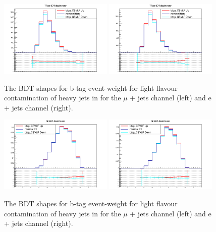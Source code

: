 \begin{figure}[ht!]
    \includegraphics[width=0.48\textwidth]{images/Run2/Sys/btag_CSVLFsystt.png}
    \includegraphics[width=0.48\textwidth]{images/Run2/Sys/btag_CSVLFsystt_e.png}     
    \caption{The BDT shapes for b-tag event-weight for light flavour contamination of heavy jets in \ttbar for the $\mu$ + jets channel (left) and e + jets channel (right).}
    \label{fig:SysShapesLFsystt}
\end{figure}
\begin{figure}[ht!]
    \includegraphics[width=0.48\textwidth]{images/Run2/Sys/btag_CSVLFsystttt.png}
    \includegraphics[width=0.48\textwidth]{images/Run2/Sys/btag_CSVLFsystttt_e.png}     
    \caption{The BDT shapes for b-tag event-weight for light flavour contamination of heavy jets in \tttt for the $\mu$ + jets channel (left) and e + jets channel (right).}
    \label{fig:SysShapesLFsystttt}
\end{figure}



